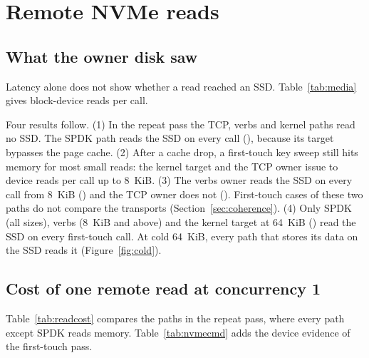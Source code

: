 \documentclass[10pt,a4paper]{article}
\newcommand{\us}{$\mu$s}
\begin{document}
\section{Remote NVMe reads}\label{sec:nvme}
\subsection{What the owner disk saw}
Latency alone does not show whether a read reached an SSD. Table~\ref{tab:media} gives block-device reads per call.
\begin{table}[!htbp]\centering

\caption{Block-device reads per call on the owner hosts (the coordinator\textquoteright s SSD for Native), from \texttt{/proc/diskstats} at the measurement gates. Zero means every read came from memory. One means a device read for each call. Live reads cover data written during the run.}\label{tab:media}
\end{table}
Four results follow. (1) In the repeat pass the TCP, verbs and kernel paths read no SSD. The SPDK path reads the SSD on every call (), because its target bypasses the page cache. (2) After a cache drop, a first-touch key sweep still hits memory for most small reads: the kernel target and the TCP owner issue  to  device reads per call up to 8~KiB. (3) The verbs owner reads the SSD on every call from 8~KiB () and the TCP owner does not (). First-touch cases of these two paths do not compare the transports (Section~\ref{sec:coherence}). (4) Only SPDK (all sizes), verbs (8~KiB and above) and the kernel target at 64~KiB () read the SSD on every first-touch call. At cold 64~KiB, every path that stores its data on the SSD reads it (Figure~\ref{fig:cold}).

\subsection{Cost of one remote read at concurrency 1}
Table~\ref{tab:readcost} compares the paths in the repeat pass, where every path except SPDK reads memory. Table~\ref{tab:nvmecmd} adds the device evidence of the first-touch pass.
\begin{table}[!htbp]\centering

\caption{Sealed repeat-pass scalar reads at concurrency 1 (8,192 calls per case): API p50/p99 in \us. Native, the owner RPC and the kernel target read memory. The SPDK target reads its SSD on every call (Table~\ref{tab:media}). One repetition.}\label{tab:readcost}
\end{table}
\begin{table}[!htbp]\centering

\caption{Sealed first-touch scalar reads at concurrency 1 ($n=8{,}192$ per case). p50 and p99 are API latencies in \us. B/call is the initiator\textquoteright s read volume per call and $\times$ its ratio to the value size. cmd is the mean block-layer time of one NVMe read at the initiator. dev/call is device reads per call on the owner hosts and dev the mean block-layer time of one such read.}\label{tab:nvmecmd}
\end{table}
\end{document}
